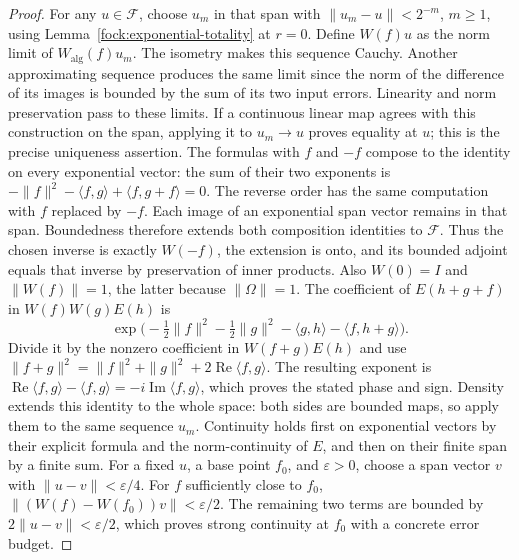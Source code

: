 \documentclass[11pt,a4paper]{article}
\theoremstyle{definition}
\theoremstyle{remark}
\begin{document}
\begin{proof}
For any $u\in\mathcal F$, choose $u_m$ in that span with
$\|u_m-u\|<2^{-m}$, $m\geq1$, using
Lemma~\ref{fock:exponential-totality} at $r=0$. Define $W(f)u$
as the norm limit of $W_{\mathrm{alg}}(f)u_m$.
The isometry makes this sequence Cauchy. Another approximating
sequence produces the same limit since the norm of the
difference of its images is bounded by the sum of its two
input errors. Linearity and norm preservation pass to these
limits. If a continuous linear map agrees with this construction
on the span, applying it to $u_m\to u$ proves equality at $u$;
this is the precise uniqueness assertion.
The formulas with $f$ and $-f$ compose to the identity on every
exponential vector: the sum of their two exponents is
$-\|f\|^2-\langle f,g\rangle+\langle f,g+f\rangle=0$.
The reverse order has the same computation with $f$ replaced
by $-f$. Each image of an exponential span vector remains in
that span. Boundedness therefore extends both composition
identities to $\mathcal F$. Thus the chosen inverse is exactly
$W(-f)$, the extension is onto, and its bounded adjoint equals
that inverse by preservation of inner products. Also $W(0)=I$
and $\|W(f)\|=1$, the latter because $\|\Omega\|=1$.
The coefficient of $E(h+g+f)$ in $W(f)W(g)E(h)$ is
\[
 \exp\big(-\tfrac12\|f\|^2-\tfrac12\|g\|^2
               -\langle g,h\rangle-\langle f,h+g\rangle\big).
\]
Divide it by the nonzero coefficient in $W(f+g)E(h)$ and use
$\|f+g\|^2=\|f\|^2+\|g\|^2+2\operatorname{Re}\langle f,g\rangle$.
The resulting exponent is
$\operatorname{Re}\langle f,g\rangle-\langle f,g\rangle
=-i\operatorname{Im}\langle f,g\rangle$, which proves the stated
phase and sign.
Density extends this identity to the whole space: both sides
are bounded maps, so apply them to the same sequence $u_m$.
Continuity holds first on exponential vectors by their explicit
formula and the norm-continuity of $E$, and then on their finite
span by a finite sum. For a fixed $u$, a base point $f_0$, and
$\varepsilon>0$, choose a span vector $v$ with
$\|u-v\|<\varepsilon/4$. For $f$ sufficiently close to $f_0$,
$\|(W(f)-W(f_0))v\|<\varepsilon/2$. The remaining two terms
are bounded by $2\|u-v\|<\varepsilon/2$, which proves strong
continuity at $f_0$ with a concrete error budget.
\end{proof}
\end{document}
